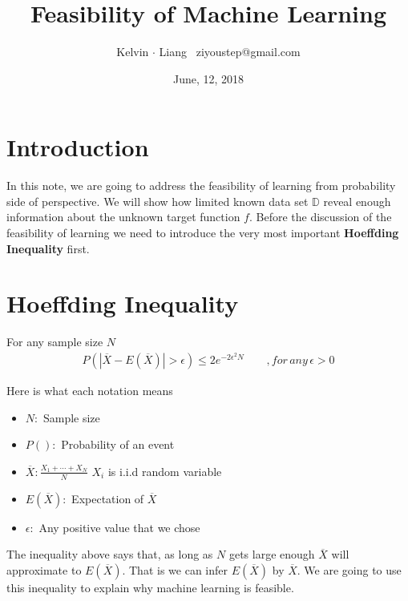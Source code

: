 \documentclass[11pt]{article}
\begin{document}
\title{Feasibility of Machine Learning}
\author{Kelvin $\cdot$ Liang \, ziyoustep@gmail.com}
\date{June, 12, 2018}
\maketitle

\section{Introduction}
In this note, we are going to address the feasibility of learning from probability side of perspective. We will show how limited known data set $\mathbb{D}$ reveal enough information about the unknown target function $f$. Before the discussion of the feasibility of learning we need to introduce the very most important \textbf{Hoeffding Inequality} first.

\section{Hoeffding Inequality}

For any sample size $N$\\
\begin{eqnarray}
P\left(|\overline{X} - E(\overline{X})| > \epsilon\right) \leq 2e^{-2\epsilon^2 N} \qquad, for \, any \, \epsilon > 0
\end{eqnarray}

Here is what each notation means\\ 
\begin{itemize}
\item $N:$ Sample size \\
\item $P():$ Probability of an event\\
\item $\displaystyle{\overline{X}:\frac{X_1+ \cdots +X_N}{N}}$ \qquad \qquad$X_i$ is i.i.d random variable\\
\item $E(\overline{X}):$ Expectation of $\overline{X}$\\
\item $\epsilon:$ Any positive value that we chose
\end{itemize}
The inequality above says that, as long as $N$ gets large enough $\overline{X}$ will approximate to ${E(\overline{X})}$. That is we can infer ${E(\overline{X})}$ by $\overline{X}$. We are going to use this inequality to explain why machine learning is feasible.
\end{document}
